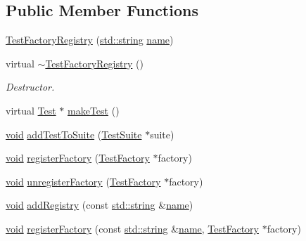 \subsection*{Public Member Functions}
\begin{DoxyCompactItemize}
\item 
\hyperlink{class_test_factory_registry_a704548465fea8b52fa449845b8b42caf}{Test\-Factory\-Registry} (\hyperlink{glew_8h_ae84541b4f3d8e1ea24ec0f466a8c568b}{std\-::string} \hyperlink{fmod__codec_8h_a5c4947d4516dd7cfa3505ce3a648a4ef}{name})
\item 
virtual \hyperlink{class_test_factory_registry_a1c0c5589eb993ad6a5b1a17d439db457}{$\sim$\-Test\-Factory\-Registry} ()
\begin{DoxyCompactList}\small\item\em Destructor. \end{DoxyCompactList}\item 
virtual \hyperlink{class_test}{Test} $\ast$ \hyperlink{class_test_factory_registry_a75fd01e6d565fb0f576ed1a887655089}{make\-Test} ()
\item 
\hyperlink{wglew_8h_aeea6e3dfae3acf232096f57d2d57f084}{void} \hyperlink{class_test_factory_registry_a39180636ddd11a499d15614a335b17d5}{add\-Test\-To\-Suite} (\hyperlink{class_test_suite}{Test\-Suite} $\ast$suite)
\item 
\hyperlink{wglew_8h_aeea6e3dfae3acf232096f57d2d57f084}{void} \hyperlink{class_test_factory_registry_a632c38375727ca735e2c1897bd625b99}{register\-Factory} (\hyperlink{class_test_factory}{Test\-Factory} $\ast$factory)
\item 
\hyperlink{wglew_8h_aeea6e3dfae3acf232096f57d2d57f084}{void} \hyperlink{class_test_factory_registry_afa3fb925b07eb34e9ccfab84812afc18}{unregister\-Factory} (\hyperlink{class_test_factory}{Test\-Factory} $\ast$factory)
\item 
\hyperlink{wglew_8h_aeea6e3dfae3acf232096f57d2d57f084}{void} \hyperlink{class_test_factory_registry_abb68b347450c97ff0dfc9ea3dfe03f4c}{add\-Registry} (const \hyperlink{glew_8h_ae84541b4f3d8e1ea24ec0f466a8c568b}{std\-::string} \&\hyperlink{fmod__codec_8h_a5c4947d4516dd7cfa3505ce3a648a4ef}{name})
\item 
\hyperlink{wglew_8h_aeea6e3dfae3acf232096f57d2d57f084}{void} \hyperlink{class_test_factory_registry_aff8d8215ec83fbb77d46706264e2f161}{register\-Factory} (const \hyperlink{glew_8h_ae84541b4f3d8e1ea24ec0f466a8c568b}{std\-::string} \&\hyperlink{fmod__codec_8h_a5c4947d4516dd7cfa3505ce3a648a4ef}{name}, \hyperlink{class_test_factory}{Test\-Factory} $\ast$factory)
\end{DoxyCompactItemize}
